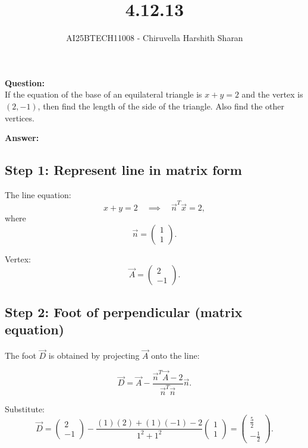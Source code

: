 \documentclass[journal]{IEEEtran}
\begin{document}

\vspace{3cm}

\title{4.12.13}
\author{AI25BTECH11008 - Chiruvella Harshith Sharan}
{\let\newpage\relax\maketitle}

\renewcommand{\thefigure}{\theenumi}
\renewcommand{\thetable}{\theenumi}
\setlength{\intextsep}{10pt} 

\renewcommand{\thetable}{\theenumi}

\textbf{Question:} \\

If the equation of the base of an equilateral triangle is $x+y=2$ and the vertex is $(2,-1)$, then find the length of the side of the triangle. Also find the other vertices.

\vspace{0.3cm}
\textbf{Answer:}

\subsection*{\textbf{Step 1: Represent line in matrix form}}

The line equation:
\[
x+y=2 \quad \implies \quad \vec{n}^T\vec{x} = 2,
\]
where
\[
\vec{n} = \begin{pmatrix}1 \\ 1\end{pmatrix}.
\]

Vertex:
\[
\vec{A} = \begin{pmatrix}2 \\ -1\end{pmatrix}.
\]

\subsection*{\textbf{Step 2: Foot of perpendicular (matrix equation)}}

The foot $\vec{D}$ is obtained by projecting $\vec{A}$ onto the line:

\[
\vec{D} = \vec{A} - \frac{\vec{n}^T\vec{A}-2}{\vec{n}^T\vec{n}}\vec{n}.
\]

Substitute:
\[
\vec{D} = \begin{pmatrix}2 \\ -1\end{pmatrix} - 
\frac{(1)(2)+(1)(-1)-2}{1^2+1^2}\begin{pmatrix}1 \\ 1\end{pmatrix}
= \begin{pmatrix}\tfrac{5}{2} \\ -\tfrac{1}{2}\end{pmatrix}.
\]
\end{document}
